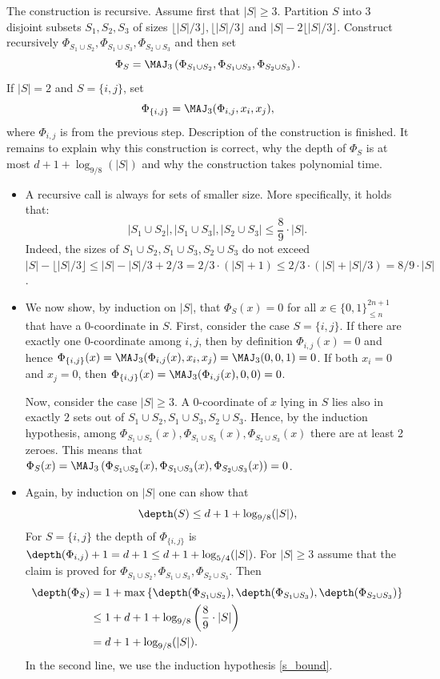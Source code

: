 The construction is recursive. Assume first that $|S| \ge 3$. Partition $S$ into $3$ disjoint subsets $S_1, S_2, S_3$ of sizes $\lfloor |S|/3\rfloor, \lfloor |S|/3\rfloor$ and $|S| - 2\lfloor |S|/3\rfloor$. 
 Construct recursively $\Phi_{S_1\cup S_2}, \Phi_{S_1 \cup S_3}, \Phi_{S_2\cup S_3}$ and then set
\[\Phi_S = \MAJ_3\left(\Phi_{S_1\cup S_2}, \Phi_{S_1\cup S_3}, \Phi_{S_2\cup S_3}\right).\]
If $|S| = 2$ and $S = \{i, j\}$, set
\[\Phi_{\{i, j\}} = \MAJ_3(\Phi_{i,j}, x_i, x_j),\]
where $\Phi_{i,j}$ is from the previous step.
Description of the construction is finished. It remains to explain why this construction is correct, why the depth of $\Phi_S$ is at most  $d + 1 + \log_{9/8}(|S|)$ and why the construction takes polynomial time.

\begin{itemize}
\item A recursive call is always for sets of smaller size. More specifically, it holds that:
\begin{equation}
\label{s_bound}
|S_1\cup S_2|, |S_1\cup S_3|, |S_2\cup S_3| \le \frac{8}{9} \cdot |S|.
\end{equation}
Indeed, the sizes of $S_1\cup S_2, S_1\cup S_3, S_2\cup S_3$ do not exceed $|S| - \lfloor|S|/3\rfloor \le |S| - |S|/3 + 2/3 = 2/3\cdot(|S| + 1) \le 2/3\cdot (|S| + |S|/3) = 8/9\cdot |S|$.

\item We now show, by induction on $|S|$, that $\Phi_S(x) = 0$ for all $x\in\{0, 1\}^{2n + 1}_{\le n}$ that have a $0$-coordinate in $S$. First, consider the case $S = \{i, j\}$. If there are exactly one $0$-coordinate among $i, j$, then by definition $\Phi_{i, j}(x) = 0$ and hence $\Phi_{\{i, j\}}(x) = \MAJ_3(\Phi_{i,j}(x), x_i, x_j) = \MAJ_3(0, 0, 1) = 0$. If both $x_i = 0$ and $x_j = 0$, then $\Phi_{\{i, j\}}(x) = \MAJ_3(\Phi_{i,j}(x), 0, 0) = 0$.

Now, consider the case $|S| \ge 3$. A $0$-coordinate of $x$ lying  in $S$ lies also in exactly $2$ sets out of $S_1\cup S_2, S_1\cup S_3, S_2\cup S_3$. Hence,  by the induction hypothesis, among $\Phi_{S_1\cup S_2}(x), \Phi_{S_1\cup S_3}(x), \Phi_{S_2\cup S_3}(x)$ there are at least 2 zeroes. This means that $\Phi_S(x) = \MAJ_3\left(\Phi_{S_1\cup S_2}(x), \Phi_{S_1\cup S_3}(x), \Phi_{S_2\cup S_3}(x)\right) = 0$.

\item Again, by induction on $|S|$ one can show that
\[\depth(S) \le d + 1 + \log_{9/8}(|S|),\]
 For $S = \{i,j\}$ the depth of $\Phi_{\{i,j\}}$ is $\depth(\Phi_{i,j}) + 1 = d + 1 \le d + 1 + \log_{5/4}(|S|)$. For $|S| \ge 3$ assume that the claim is proved for $\Phi_{S_1\cup S_2}, \Phi_{S_1 \cup S_3}, \Phi_{S_2\cup S_3}$. Then
\begin{align*}
\depth(\Phi_S) &= 1 + \max\left\{\depth(\Phi_{S_1\cup S_2}), \depth(\Phi_{S_1\cup S_3}), \depth(\Phi_{S_2\cup S_3})\right\} \\
&\le 1 + d + 1 + \log_{9/8}\left(\frac{8}{9} \cdot |S|\right) \\
&= d + 1 + \log_{9/8}(|S|).
\end{align*}
In the second line, we use the induction hypothesis \eqref{s_bound}.


\end{itemize}
